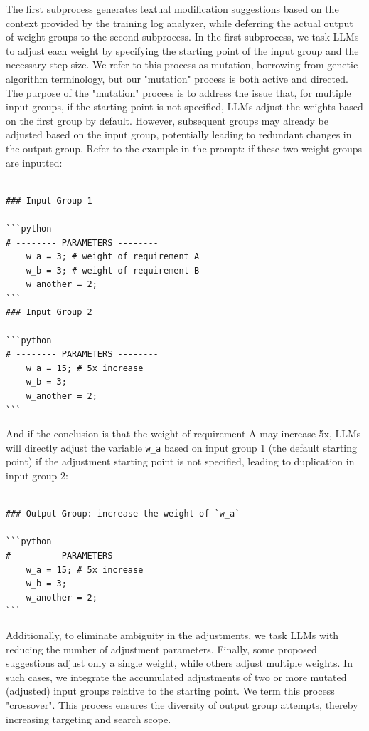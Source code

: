 \documentclass{article}
\begin{document}
The first subprocess generates textual modification suggestions based on the context provided by the training log analyzer, while deferring the actual output of weight groups to the second subprocess. In the first subprocess, we task LLMs to adjust each weight by specifying the starting point of the input group and the necessary step size. We refer to this process as mutation, borrowing from genetic algorithm terminology, but our "mutation" process is both active and directed. The purpose of the "mutation" process is to address the issue that, for multiple input groups, if the starting point is not specified, LLMs adjust the weights based on the first group by default. However, subsequent groups may already be adjusted based on the input group, potentially leading to redundant changes in the output group. Refer to the example in the prompt: if these two weight groups are inputted:

\begin{verbatim}

### Input Group 1

```python
# -------- PARAMETERS --------
    w_a = 3; # weight of requirement A
    w_b = 3; # weight of requirement B
    w_another = 2;
```
### Input Group 2

```python
# -------- PARAMETERS --------
    w_a = 15; # 5x increase
    w_b = 3;
    w_another = 2;
```
\end{verbatim}

And if the conclusion is that the weight of requirement A may increase 5x, LLMs will directly adjust the variable \verb|w_a| based on input group 1 (the default starting point) if the adjustment starting point is not specified, leading to duplication in input group 2:

\begin{verbatim}

### Output Group: increase the weight of `w_a`

```python
# -------- PARAMETERS --------
    w_a = 15; # 5x increase
    w_b = 3;
    w_another = 2;
```
\end{verbatim}

Additionally, to eliminate ambiguity in the adjustments, we task LLMs with reducing the number of adjustment parameters. Finally, some proposed suggestions adjust only a single weight, while others adjust multiple weights. In such cases, we integrate the accumulated adjustments of two or more mutated (adjusted) input groups relative to the starting point. We term this process "crossover". This process ensures the diversity of output group attempts, thereby increasing targeting and search scope.
\end{document}
